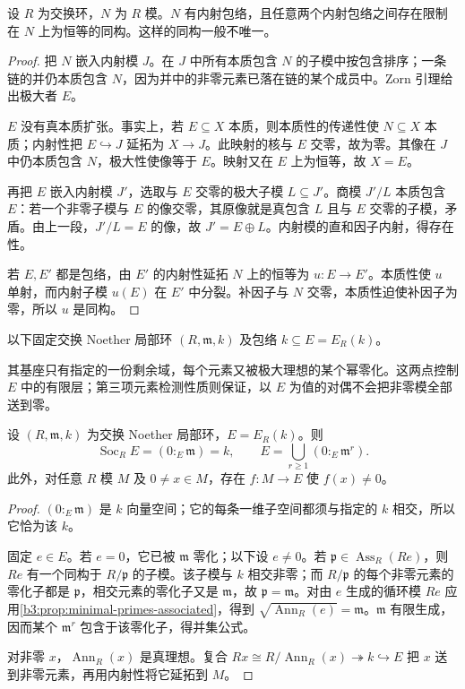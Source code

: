 \begin{proposition}\label{b3:prop:injective-hull-existence}
	设 \(R\) 为交换环，\(N\) 为 \(R\) 模。\(N\) 有内射包络，且任意两个内射包络之间存在限制在 \(N\) 上为恒等的同构。这样的同构一般不唯一。
\end{proposition}
\begin{proof}
	把 \(N\) 嵌入内射模 \(J\)。在 \(J\) 中所有本质包含 \(N\) 的子模中按包含排序；一条链的并仍本质包含 \(N\)，因为并中的非零元素已落在链的某个成员中。Zorn 引理给出极大者 \(E\)。

	\(E\) 没有真本质扩张。事实上，若 \(E\subseteq X\) 本质，则本质性的传递性使 \(N\subseteq X\) 本质；内射性把 \(E\hookrightarrow J\) 延拓为 \(X\rightarrow J\)。此映射的核与 \(E\) 交零，故为零。其像在 \(J\) 中仍本质包含 \(N\)，极大性使像等于 \(E\)。映射又在 \(E\) 上为恒等，故 \(X=E\)。

	再把 \(E\) 嵌入内射模 \(J'\)，选取与 \(E\) 交零的极大子模 \(L\subseteq J'\)。商模 \(J'/L\) 本质包含 \(E\)：若一个非零子模与 \(E\) 的像交零，其原像就是真包含 \(L\) 且与 \(E\) 交零的子模，矛盾。由上一段，\(J'/L=E\) 的像，故 \(J'=E\oplus L\)。内射模的直和因子内射，得存在性。

	若 \(E,E'\) 都是包络，由 \(E'\) 的内射性延拓 \(N\) 上的恒等为 \(u:E\rightarrow E'\)。本质性使 \(u\) 单射，而内射子模 \(u(E)\) 在 \(E'\) 中分裂。补因子与 \(N\) 交零，本质性迫使补因子为零，所以 \(u\) 是同构。
\end{proof}

以下固定交换 Noether 局部环 \((R,\mathfrak m,k)\) 及包络 \(k\subseteq E=E_R(k)\)。

\ProseParagraphBreak
其基座只有指定的一份剩余域，每个元素又被极大理想的某个幂零化。这两点控制 \(E\) 中的有限层；第三项元素检测性质则保证，以 \(E\) 为值的对偶不会把非零模全部送到零。

\begin{proposition}\label{b3:prop:injective-hull-local-properties}
	设 \((R,\mathfrak m,k)\) 为交换 Noether 局部环，\(E=E_R(k)\)。则
	\[
		\operatorname{Soc}_R E=(0:_E\mathfrak m)=k, \qquad E=\bigcup_{r\ge1}(0:_E\mathfrak m^r).
	\]
	此外，对任意 \(R\) 模 \(M\) 及 \(0\ne x\in M\)，存在 \(f:M\rightarrow E\) 使 \(f(x)\ne0\)。
\end{proposition}
\begin{proof}
	\((0:_E\mathfrak m)\) 是 \(k\) 向量空间；它的每条一维子空间都须与指定的 \(k\) 相交，所以它恰为该 \(k\)。

	固定 \(e\in E\)。若 \(e=0\)，它已被 \(\mathfrak m\) 零化；以下设 \(e\ne0\)。若 \(\mathfrak p\in\operatorname{Ass}_R(Re)\)，则 \(Re\) 有一个同构于 \(R/\mathfrak p\) 的子模。该子模与 \(k\) 相交非零；而 \(R/\mathfrak p\) 的每个非零元素的零化子都是 \(\mathfrak p\)，相交元素的零化子又是 \(\mathfrak m\)，故 \(\mathfrak p=\mathfrak m\)。对由 \(e\) 生成的循环模 \(Re\) 应用\cref{b3:prop:minimal-primes-associated}，得到 \(\sqrt{\operatorname{Ann}_R(e)}=\mathfrak m\)。\(\mathfrak m\) 有限生成，因而某个 \(\mathfrak m^r\) 包含于该零化子，得并集公式。

	对非零 \(x\)，\(\operatorname{Ann}_R(x)\) 是真理想。复合 \(Rx\cong R/\operatorname{Ann}_R(x)\twoheadrightarrow k\hookrightarrow E\) 把 \(x\) 送到非零元素，再用内射性将它延拓到 \(M\)。
\end{proof}

